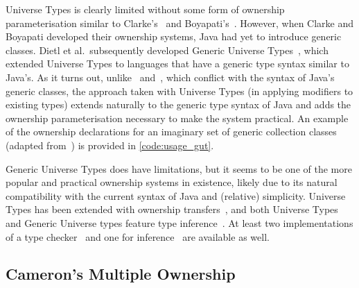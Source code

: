 \documentclass{acm_proc_article-sp}
\begin{document}


Universe Types is clearly limited without some form of ownership
parameterisation similar to Clarke's~\cite{clarke03ownership} and
Boyapati's~\cite{boyapati04safejava}. However, when Clarke and Boyapati
developed their ownership systems, Java had yet to introduce generic classes.
Dietl et al.\ subsequently developed Generic Universe
Types~\cite{dietl07gut,dietl09gut,dietl11gut}, which extended Universe Types to
languages that have a generic type syntax similar to Java's. As it turns out,
unlike~\cite{clarke03ownership} and~\cite{boyapati04safejava}, which conflict
with the syntax of Java's generic classes, the approach taken with Universe
Types (in applying modifiers to existing types) extends naturally to the
generic type syntax of Java and adds the ownership parameterisation necessary
to make the system practical. An example of the ownership declarations for an
imaginary set of generic collection classes (adapted from~\cite{dietl07gut}) is
provided in \cref{code:usage_gut}.

Generic Universe Types does have limitations, but it seems to be one of the more
popular and practical ownership systems in existence, likely due to its natural
compatibility with the current syntax of Java and (relative) simplicity.
Universe Types has been extended with ownership
transfers~\cite{muller07transfer}, and both Universe Types and Generic Universe
types feature type inference~\cite{dietl11inference}. At least two
implementations of a type checker~\cite{cameron10gut,dietl14checker} and one for
inference~\cite{dietl14checker} are available as well.

%
%


\subsection{Cameron's Multiple Ownership}
\label{subsec:cameron}
\end{document}

